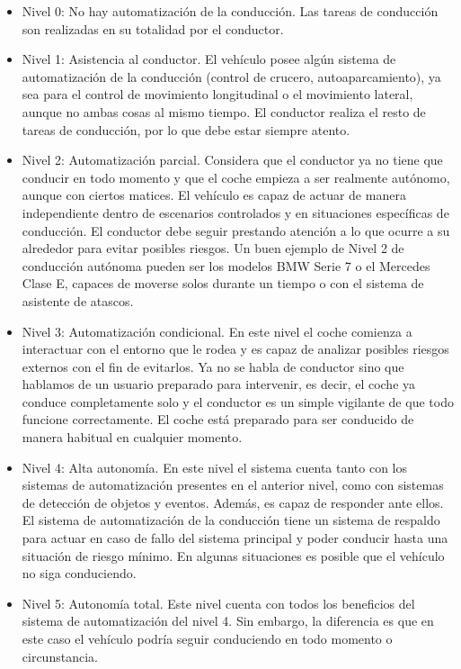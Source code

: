 \begin{itemize}
    \item Nivel 0: No hay automatización de la conducción. Las tareas de conducción son realizadas en su totalidad por el conductor.
    
    \item Nivel 1: Asistencia al conductor. El vehículo posee algún sistema de automatización de la conducción (control de crucero, autoaparcamiento), ya sea para el control de movimiento longitudinal o el movimiento lateral, aunque no ambas cosas al mismo tiempo. El conductor realiza el resto de tareas de conducción, por lo que debe estar siempre atento.
    
    \item Nivel 2: Automatización parcial. Considera que el conductor ya no tiene que conducir en todo momento y que el coche empieza a ser realmente autónomo, aunque con ciertos matices. El vehículo es capaz de actuar de manera independiente dentro de escenarios controlados y en situaciones específicas de conducción. El conductor debe seguir prestando atención a lo que ocurre a su alrededor para evitar posibles riesgos. Un buen ejemplo de Nivel 2 de conducción autónoma pueden ser los modelos BMW Serie 7 o el Mercedes Clase E, capaces de moverse solos durante un tiempo o con el sistema de asistente de atascos.
    
    \item Nivel 3: Automatización condicional. En este nivel el coche comienza a interactuar con el entorno que le rodea y es capaz de analizar posibles riesgos externos con el fin de evitarlos. Ya no se habla de conductor sino que hablamos de un usuario preparado para intervenir, es decir, el coche ya conduce completamente solo y el conductor es un simple vigilante de que todo funcione correctamente. El coche está preparado para ser conducido de manera habitual en cualquier momento.
    
    \item Nivel 4: Alta autonomía. En este nivel el sistema cuenta tanto con los sistemas de automatización presentes en el anterior nivel, como con sistemas de detección de objetos y eventos. Además, es capaz de responder ante ellos. El sistema de automatización de la conducción tiene un sistema de respaldo para actuar en caso de fallo del sistema principal y poder conducir hasta una situación de riesgo mínimo. En algunas situaciones es posible que el vehículo no siga conduciendo.
    
    \item Nivel 5: Autonomía total. Este nivel cuenta con todos los beneficios del sistema de automatización del nivel 4. Sin embargo, la diferencia es que en este caso el vehículo podría seguir conduciendo en todo momento o circunstancia.
\end{itemize}

